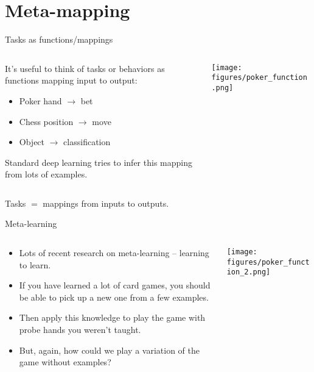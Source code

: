 \documentclass{beamer}
\begin{document}
\section{Meta-mapping}

\begin{frame}{Tasks as functions/mappings}
\begin{columns}
\begin{column}{0.5\textwidth}
It's useful to think of tasks or behaviors as functions mapping input to output:
\begin{itemize}
    \item Poker hand \(\rightarrow\) bet
    \item Chess position \(\rightarrow\) move
    \item Object \(\rightarrow\) classification
\end{itemize}
Standard deep learning tries to infer this mapping from lots of examples. 
\end{column}

\begin{column}{0.5\textwidth}
\texttt{[image: figures/poker\_function.png]}
\end{column}
\end{columns}
\end{frame}

\begin{frame}[standout]
Tasks \(\bm =\) mappings from inputs to outputs. 
\end{frame}

\begin{frame}{Meta-learning}
\begin{columns}
\begin{column}{0.5\textwidth}

\begin{itemize}[<+->]
    \item Lots of recent research on meta-learning -- learning to learn.
    \item If you have learned a lot of card games, you should be able to pick up a new one from a few examples.
    \item Then apply this knowledge to play the game with probe hands you weren't taught. 
    \item But, again, how could we play a variation of the game without examples? 
\end{itemize}
\end{column}

\begin{column}{0.5\textwidth}
\texttt{[image: figures/poker\_function\_2.png]}
\end{column}
\end{columns}
\end{frame}
\end{document}
